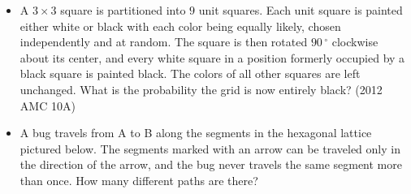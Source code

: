 \documentclass{article}
\begin{document}
\begin{itemize}

\item A $3 \times 3$ square is partitioned into $9$ unit squares. Each unit square is painted either white or black with each color being equally likely, chosen independently and at random. The square is then rotated $90\,^{\circ}$ clockwise about its center, and every white square in a position formerly occupied by a black square is painted black. The colors of all other squares are left unchanged. What is the probability the grid is now entirely black? (2012 AMC 10A)

\item A bug travels from A to B along the segments in the hexagonal lattice pictured below. The segments marked with an arrow can be traveled only in the direction of the arrow, and the bug never travels the same segment more than once. How many different paths are there?


\end{itemize}
\end{document}

